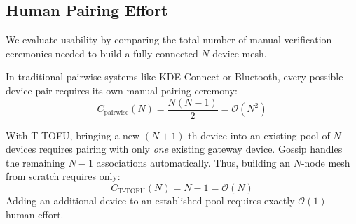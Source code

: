 \documentclass[conference]{IEEEtran}
\begin{document}
\subsection{Human Pairing Effort}
We evaluate usability by comparing the total number of manual verification ceremonies needed to build a fully connected $N$-device mesh.

In traditional pairwise systems like KDE Connect or Bluetooth, every possible device pair requires its own manual pairing ceremony:
\begin{equation}
    C_{\text{pairwise}}(N) = \frac{N(N-1)}{2} = \mathcal{O}(N^2)
\end{equation}

With T-TOFU, bringing a new $(N+1)$-th device into an existing pool of $N$ devices requires pairing with only \textit{one} existing gateway device. Gossip handles the remaining $N-1$ associations automatically. Thus, building an $N$-node mesh from scratch requires only:
\begin{equation}
    C_{\text{T-TOFU}}(N) = N - 1 = \mathcal{O}(N)
\end{equation}
Adding an additional device to an established pool requires exactly $\mathcal{O}(1)$ human effort.
\end{document}

